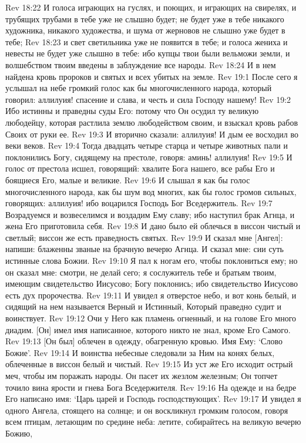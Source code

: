 Rev 18:22  И голоса играющих на гуслях, и поющих, и играющих на свирелях, и трубящих трубами в тебе уже не слышно будет; не будет уже в тебе никакого художника, никакого художества, и шума от жерновов не слышно уже будет в тебе;
Rev 18:23  и свет светильника уже не появится в тебе; и голоса жениха и невесты не будет уже слышно в тебе: ибо купцы твои были вельможи земли, и волшебством твоим введены в заблуждение все народы.
Rev 18:24  И в нем найдена кровь пророков и святых и всех убитых на земле.
Rev 19:1  После сего я услышал на небе громкий голос как бы многочисленного народа, который говорил: аллилуия! спасение и слава, и честь и сила Господу нашему!
Rev 19:2  Ибо истинны и праведны суды Его: потому что Он осудил ту великую любодейцу, которая растлила землю любодейством своим, и взыскал кровь рабов Своих от руки ее.
Rev 19:3  И вторично сказали: аллилуия! И дым ее восходил во веки веков.
Rev 19:4  Тогда двадцать четыре старца и четыре животных пали и поклонились Богу, сидящему на престоле, говоря: аминь! аллилуия!
Rev 19:5  И голос от престола исшел, говорящий: хвалите Бога нашего, все рабы Его и боящиеся Его, малые и великие.
Rev 19:6  И слышал я как бы голос многочисленного народа, как бы шум вод многих, как бы голос громов сильных, говорящих: аллилуия! ибо воцарился Господь Бог Вседержитель.
Rev 19:7  Возрадуемся и возвеселимся и воздадим Ему славу; ибо наступил брак Агнца, и жена Его приготовила себя.
Rev 19:8  И дано было ей облечься в виссон чистый и светлый; виссон же есть праведность святых.
Rev 19:9  И сказал мне [Ангел]: напиши: блаженны званые на брачную вечерю Агнца. И сказал мне: сии суть истинные слова Божии.
Rev 19:10  Я пал к ногам его, чтобы поклониться ему; но он сказал мне: смотри, не делай сего; я сослужитель тебе и братьям твоим, имеющим свидетельство Иисусово; Богу поклонись; ибо свидетельство Иисусово есть дух пророчества.
Rev 19:11  И увидел я отверстое небо, и вот конь белый, и сидящий на нем называется Верный и Истинный, Который праведно судит и воинствует.
Rev 19:12  Очи у Него как пламень огненный, и на голове Его много диадим. [Он] имел имя написанное, которого никто не знал, кроме Его Самого.
Rev 19:13  [Он был] облечен в одежду, обагренную кровью. Имя Ему: `Слово Божие'.
Rev 19:14  И воинства небесные следовали за Ним на конях белых, облеченные в виссон белый и чистый.
Rev 19:15  Из уст же Его исходит острый меч, чтобы им поражать народы. Он пасет их жезлом железным; Он топчет точило вина ярости и гнева Бога Вседержителя.
Rev 19:16  На одежде и на бедре Его написано имя: `Царь царей и Господь господствующих'.
Rev 19:17  И увидел я одного Ангела, стоящего на солнце; и он воскликнул громким голосом, говоря всем птицам, летающим по средине неба: летите, собирайтесь на великую вечерю Божию,
